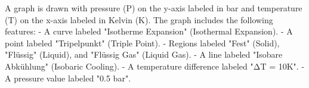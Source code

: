 A graph is drawn with pressure (P) on the y-axis labeled in bar and temperature (T) on the x-axis labeled in Kelvin (K). The graph includes the following features:  
- A curve labeled "Isotherme Expansion" (Isothermal Expansion).  
- A point labeled "Tripelpunkt" (Triple Point).  
- Regions labeled "Fest" (Solid), "Flüssig" (Liquid), and "Flüssig Gas" (Liquid Gas).  
- A line labeled "Isobare Abkühlung" (Isobaric Cooling).  
- A temperature difference labeled "ΔT = 10K".  
- A pressure value labeled "0.5 bar".